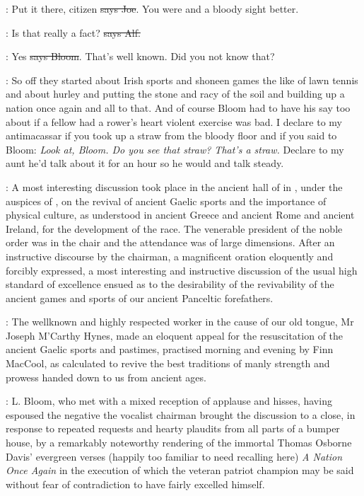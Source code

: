 \joe:
Put it there, citizen \sout{says Joe}.
You were and a bloody sight better.

\bergan:
Is that really a fact? \sout{says Alf.}

\Bloom:
Yes \sout{says Bloom}.
That's well known. Did you not know that?

\Nq:
So off they started about Irish sports and shoneen games the like of lawn
tennis and about hurley and putting the stone and racy of the soil and
building up a nation once again and all to that. And of course Bloom had
to have his say too about if a fellow had a rower's heart violent
exercise was bad. I declare to my antimacassar if you took up a
straw from the bloody floor and if you said to Bloom: \emph{Look at, Bloom.
Do you see that straw? That's a straw.} Declare to my aunt he'd talk
about it for an hour so he would and talk steady.

:
A most interesting discussion took place in the ancient hall of
 in ,
under the auspices of ,
on the revival of ancient Gaelic sports and the importance of
physical culture, as understood in ancient Greece and ancient Rome and
ancient Ireland, for the development of the race. The venerable president
of the noble order was in the chair and the attendance was of large
dimensions. After an instructive discourse by the chairman, a magnificent
oration eloquently and forcibly expressed, a most interesting and
instructive discussion of the usual high standard of excellence
ensued as to the desirability of the revivability of the ancient
games and sports of our ancient Panceltic forefathers.

:
The wellknown and highly respected worker in the cause of our old
tongue, Mr Joseph M'Carthy Hynes, made an eloquent appeal for
the resuscitation of the ancient Gaelic sports and pastimes,
practised morning and evening by Finn MacCool, as calculated to revive the
best traditions of manly strength and prowess handed down to us from
ancient ages.

:
L. Bloom, who met with a mixed reception of applause and
hisses, having espoused the negative the vocalist chairman brought the
discussion to a close, in response to repeated requests and hearty
plaudits from all parts of a bumper house, by a remarkably noteworthy
rendering of the immortal Thomas Osborne Davis' evergreen verses (happily
too familiar to need recalling here) \emph{A Nation Once Again} in the execution
of which the veteran patriot champion may be said without fear of
contradiction to have fairly excelled himself.

